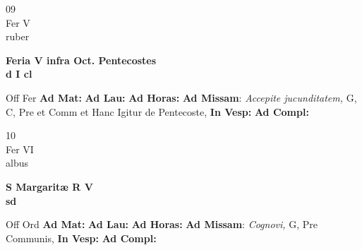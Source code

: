 \documentclass[10pt, openany]{book}
\begin{document}
        \begin{center}
            \begin{minipage}{3.5in}
                \vspace{2em}
                \begin{minipage}{0.5in}
                    {\Huge 09} \\
                    {\normalsize Fer V} \\
                    {\normalsize ruber}
                \end{minipage}
                \begin{minipage}{3.0in}
                    \textbf{ \large Feria V infra Oct. Pentecostes \\
                    \textnormal{\normalsize d I cl}} \\ 
                \end{minipage}
                \begin{justify}Off Fer
                    \textbf{Ad Mat: }
                    \textbf{Ad Lau: }
                    \textbf{Ad Horas: }\textbf{Ad Missam}: \textit{Accepite jucunditatem,} G, C, Pre et Comm et Hanc Igitur de Pentecoste,  
                    \textbf{In Vesp: }
                    \textbf{Ad Compl: }
                \end{justify}
            \end{minipage}
        \end{center}
    
        \begin{center}
            \begin{minipage}{3.5in}
                \vspace{2em}
                \begin{minipage}{0.5in}
                    {\Huge 10} \\
                    {\normalsize Fer VI} \\
                    {\normalsize albus}
                \end{minipage}
                \begin{minipage}{3.0in}
                    \textbf{ \large S Margaritæ R V \\
                    \textnormal{\normalsize sd}} \\ 
                \end{minipage}
                \begin{justify}Off Ord
                    \textbf{Ad Mat: }
                    \textbf{Ad Lau: }
                    \textbf{Ad Horas: }\textbf{Ad Missam}: \textit{Cognovi,} G, Pre Communis,  
                    \textbf{In Vesp: }
                    \textbf{Ad Compl: }
                \end{justify}
            \end{minipage}
        \end{center}
    
\end{document}

